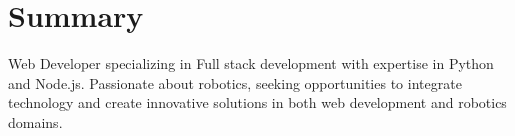 \section*{Summary}
% 





Web Developer specializing in Full stack development with expertise in Python and Node.js. Passionate about robotics, seeking opportunities to integrate technology and create innovative solutions in both web development and robotics domains.
